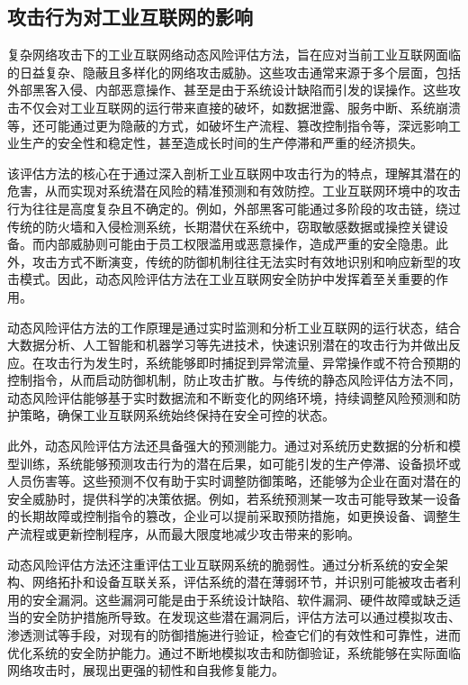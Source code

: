 \subsection{攻击行为对工业互联网的影响}

复杂网络攻击下的工业互联网络动态风险评估方法，旨在应对当前工业互联网面临的日益复杂、隐蔽且多样化的网络攻击威胁。这些攻击通常来源于多个层面，包括外部黑客入侵、内部恶意操作、甚至是由于系统设计缺陷而引发的误操作。这些攻击不仅会对工业互联网的运行带来直接的破坏，如数据泄露、服务中断、系统崩溃等，还可能通过更为隐蔽的方式，如破坏生产流程、篡改控制指令等，深远影响工业生产的安全性和稳定性，甚至造成长时间的生产停滞和严重的经济损失。

该评估方法的核心在于通过深入剖析工业互联网中攻击行为的特点，理解其潜在的危害，从而实现对系统潜在风险的精准预测和有效防控。工业互联网环境中的攻击行为往往是高度复杂且不确定的。例如，外部黑客可能通过多阶段的攻击链，绕过传统的防火墙和入侵检测系统，长期潜伏在系统中，窃取敏感数据或操控关键设备。而内部威胁则可能由于员工权限滥用或恶意操作，造成严重的安全隐患。此外，攻击方式不断演变，传统的防御机制往往无法实时有效地识别和响应新型的攻击模式。因此，动态风险评估方法在工业互联网安全防护中发挥着至关重要的作用。

动态风险评估方法的工作原理是通过实时监测和分析工业互联网的运行状态，结合大数据分析、人工智能和机器学习等先进技术，快速识别潜在的攻击行为并做出反应。在攻击行为发生时，系统能够即时捕捉到异常流量、异常操作或不符合预期的控制指令，从而启动防御机制，防止攻击扩散。与传统的静态风险评估方法不同，动态风险评估能够基于实时数据流和不断变化的网络环境，持续调整风险预测和防护策略，确保工业互联网系统始终保持在安全可控的状态。

此外，动态风险评估方法还具备强大的预测能力。通过对系统历史数据的分析和模型训练，系统能够预测攻击行为的潜在后果，如可能引发的生产停滞、设备损坏或人员伤害等。这些预测不仅有助于实时调整防御策略，还能够为企业在面对潜在的安全威胁时，提供科学的决策依据。例如，若系统预测某一攻击可能导致某一设备的长期故障或控制指令的篡改，企业可以提前采取预防措施，如更换设备、调整生产流程或更新控制程序，从而最大限度地减少攻击带来的影响。

动态风险评估方法还注重评估工业互联网系统的脆弱性。通过分析系统的安全架构、网络拓扑和设备互联关系，评估系统的潜在薄弱环节，并识别可能被攻击者利用的安全漏洞。这些漏洞可能是由于系统设计缺陷、软件漏洞、硬件故障或缺乏适当的安全防护措施所导致。在发现这些潜在漏洞后，评估方法可以通过模拟攻击、渗透测试等手段，对现有的防御措施进行验证，检查它们的有效性和可靠性，进而优化系统的安全防护能力。通过不断地模拟攻击和防御验证，系统能够在实际面临网络攻击时，展现出更强的韧性和自我修复能力。

